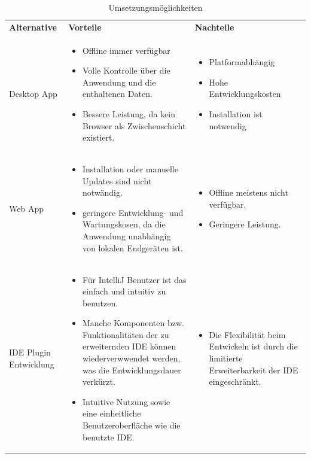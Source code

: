 \begin{table}
	\centering
		\begin{tabular}{ |p{3cm}|p{6cm}|p{6cm}| }
			\hline
			\textbf{Alternative} & \textbf{Vorteile} &  \textbf{Nachteile}  \\
			Desktop App & 
			\begin{itemize}
				\item Offline immer verfügbar
				\item Volle Kontrolle über die Anwendung und die enthaltenen Daten.
				\item Bessere Leistung, da kein Browser als Zwischenschicht existiert.
			\end{itemize}& 
			\begin{itemize}
				\item Platformabhängig
				\item Hohe Entwicklungskosten
				\item Installation ist notwendig
			\end{itemize} \\
			\hline
			Web App &
			
			\begin{itemize}
				\item Installation oder manuelle Updates sind nicht notwändig. 
				\item geringere Entwicklung- und Wartungskosen, da die Anwendung unabhängig von lokalen Endgeräten ist.
			\end{itemize} &
		
			\begin{itemize}
				\item Offline meistens nicht verfügbar.
				\item Geringere Leistung.
			\end{itemize} \\
			\hline
			IDE Plugin Entwicklung &
			
			\begin{itemize}
				\item Für IntelliJ Benutzer ist das einfach und intuitiv zu benutzen.
				\item Manche Komponenten bzw. Funktionalitäten der zu erweiternden IDE können wiederverwwendet werden, was die Entwicklungsdauer verkürzt.
				\item Intuitive Nutzung sowie eine einheitliche Benutzeroberfläche wie die benutzte IDE.
			\end{itemize} &
			
			\begin{itemize}
				\item Die Flexibilität beim Entwickeln ist durch die limitierte Erweiterbarkeit der IDE eingeschränkt.
			\end{itemize} \\
			\hline
		
		\end{tabular}
	\caption{Umsetzungsmöglichkeiten}
	\label{table:tool-options}
\end{table}


